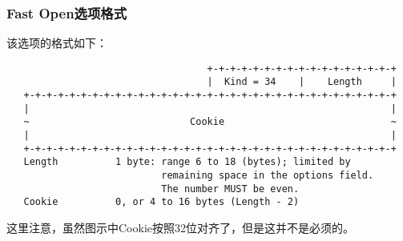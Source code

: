 \subsubsection{Fast Open选项格式}
\label{subsubsec:fast-open-option}
该选项的格式如下：
\begin{verbatim}
                                   +-+-+-+-+-+-+-+-+-+-+-+-+-+-+-+-+
                                   |  Kind = 34    |    Length     |
   +-+-+-+-+-+-+-+-+-+-+-+-+-+-+-+-+-+-+-+-+-+-+-+-+-+-+-+-+-+-+-+-+
   |                                                               |
   ~                            Cookie                             ~
   |                                                               |
   +-+-+-+-+-+-+-+-+-+-+-+-+-+-+-+-+-+-+-+-+-+-+-+-+-+-+-+-+-+-+-+-+
   Length          1 byte: range 6 to 18 (bytes); limited by
                           remaining space in the options field.
                           The number MUST be even.
   Cookie          0, or 4 to 16 bytes (Length - 2)
\end{verbatim}
这里注意，虽然图示中Cookie按照32位对齐了，但是这并不是必须的。
